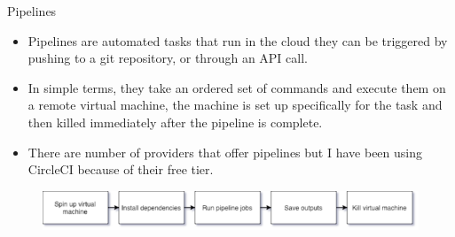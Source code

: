 \documentclass[aspectratio=169]{beamer}
\begin{document}
\begin{frame}{Pipelines}

\begin{itemize}
	\item Pipelines are automated tasks that run in the cloud they can be triggered by pushing to a git repository, or through an API call.
	\item In simple terms, they take an ordered set of commands and execute them on a remote virtual machine, the machine is set up specifically for the task and then killed immediately after the pipeline is complete.
	\item There are number of providers that offer pipelines but I have been using CircleCI because of their free tier. 
\end{itemize}

\begin{figure}
\centering
\includegraphics[scale=0.6]{graphics/pipeline-process.png}	
\end{figure}


\end{frame}
\end{document}
